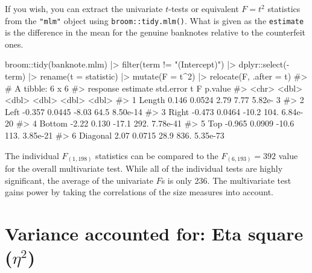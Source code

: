 \documentclass[
  letterpaper,
  10pt,
  krantz2]{krantz}
\makeatletter
\newenvironment{Shaded}{\begin{snugshade}}{\end{snugshade}}
\newcommand{\AttributeTok}[1]{\textcolor[rgb]{0.40,0.45,0.13}{#1}}
\newcommand{\CommentTok}[1]{\textcolor[rgb]{0.37,0.37,0.37}{#1}}
\newcommand{\DecValTok}[1]{\textcolor[rgb]{0.68,0.00,0.00}{#1}}
\newcommand{\FunctionTok}[1]{\textcolor[rgb]{0.28,0.35,0.67}{#1}}
\newcommand{\NormalTok}[1]{\textcolor[rgb]{0.00,0.23,0.31}{#1}}
\newcommand{\SpecialCharTok}[1]{\textcolor[rgb]{0.37,0.37,0.37}{#1}}
\newcommand{\StringTok}[1]{\textcolor[rgb]{0.13,0.47,0.30}{#1}}
\newenvironment{kframe}{%
  \medskip{}
  \setlength{\fboxsep}{.8em}
  \def\at@end@of@kframe{}%
  \ifinner\ifhmode%
  \def\at@end@of@kframe{\end{minipage}}%
  \begin{minipage}{\columnwidth}%
  \fi\fi%
  \def\FrameCommand##1{\hskip\@totalleftmargin \hskip-\fboxsep
  \colorbox{shadecolor}{##1}\hskip-\fboxsep
      \hskip-\linewidth \hskip-\@totalleftmargin \hskip\columnwidth}%
  \MakeFramed {\advance\hsize-\width
    \@totalleftmargin\z@ \linewidth\hsize
    \@setminipage}}%
{\par\unskip\endMakeFramed%
  \at@end@of@kframe}
\renewenvironment{Shaded}{\begin{kframe}}{\end{kframe}}
\makeatother
\begin{document}
If you wish, you can extract the univariate \(t\)-tests or equivalent
\(F = t^2\) statistics from the \texttt{"mlm"} object using
\texttt{broom::tidy.mlm()}. What is given as the \texttt{estimate} is
the difference in the mean for the genuine banknotes relative to the
counterfeit ones.

\begin{Shaded}
\begin{Highlighting}[]
\NormalTok{broom}\SpecialCharTok{::}\FunctionTok{tidy}\NormalTok{(banknote.mlm) }\SpecialCharTok{|\textgreater{}} 
  \FunctionTok{filter}\NormalTok{(term }\SpecialCharTok{!=} \StringTok{"(Intercept)"}\NormalTok{) }\SpecialCharTok{|\textgreater{}}
\NormalTok{  dplyr}\SpecialCharTok{::}\FunctionTok{select}\NormalTok{(}\SpecialCharTok{{-}}\NormalTok{term) }\SpecialCharTok{|\textgreater{}}
  \FunctionTok{rename}\NormalTok{(}\AttributeTok{t =}\NormalTok{ statistic) }\SpecialCharTok{|\textgreater{}}
  \FunctionTok{mutate}\NormalTok{(}\AttributeTok{F =}\NormalTok{ t}\SpecialCharTok{\^{}}\DecValTok{2}\NormalTok{) }\SpecialCharTok{|\textgreater{}}
  \FunctionTok{relocate}\NormalTok{(F, }\AttributeTok{.after =}\NormalTok{ t)}
\CommentTok{\#\textgreater{} \# A tibble: 6 x 6}
\CommentTok{\#\textgreater{}   response estimate std.error      t      F  p.value}
\CommentTok{\#\textgreater{}   \textless{}chr\textgreater{}       \textless{}dbl\textgreater{}     \textless{}dbl\textgreater{}  \textless{}dbl\textgreater{}  \textless{}dbl\textgreater{}    \textless{}dbl\textgreater{}}
\CommentTok{\#\textgreater{} 1 Length      0.146    0.0524   2.79   7.77 5.82e{-} 3}
\CommentTok{\#\textgreater{} 2 Left       {-}0.357    0.0445  {-}8.03  64.5  8.50e{-}14}
\CommentTok{\#\textgreater{} 3 Right      {-}0.473    0.0464 {-}10.2  104.   6.84e{-}20}
\CommentTok{\#\textgreater{} 4 Bottom     {-}2.22     0.130  {-}17.1  292.   7.78e{-}41}
\CommentTok{\#\textgreater{} 5 Top        {-}0.965    0.0909 {-}10.6  113.   3.85e{-}21}
\CommentTok{\#\textgreater{} 6 Diagonal    2.07     0.0715  28.9  836.   5.35e{-}73}
\end{Highlighting}
\end{Shaded}

The individual \(F_{(1, 198)}\) statistics can be compared to the
\(F_{(6, 193)} = 392\) value for the overall multivariate test. While
all of the individual tests are highly significant, the average of the
univariate \(F\)s is only 236. The multivariate test gains power by
taking the correlations of the size measures into account.

\section{\texorpdfstring{Variance accounted for: Eta square
(\(\eta^2\))}{Variance accounted for: Eta square (\textbackslash eta\^{}2)}}\label{variance-accounted-for-eta-square-eta2}
\end{document}
